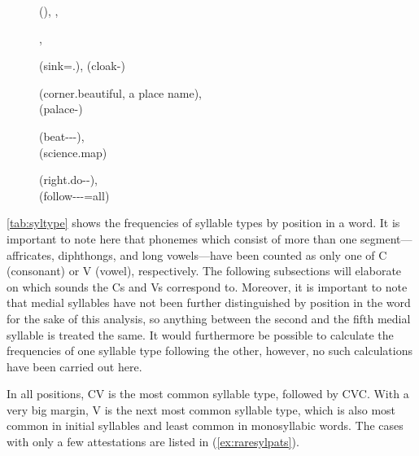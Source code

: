 \begin{figure}
\pex\label{ex:syllperwordtypes}
	\a {} (\AgtT{}),
		,
		
	\a {},
		
	\a {} 
		(sink=\TsgM{}.\Aarg{}), 
		 (cloak-\PargI{})
		
	\a {} (corner.beautiful, a place 
		name),\\
		 (palace-\Gen{})
		
	\a {} 
		(beat-\Ptcp{}-\Nmlz{}-\Parg{}),\\
		(science.map)
		
	\a {} 
		(right.do-\Nmlz{}-\Gen{}),\\
		 (follow-\Agtz-\Pl{}-\Aarg{}=all)
\xe
\end{figure}

\autoref{tab:syltype} shows the frequencies of syllable
types by position in a word. It is important to note here
that phonemes which consist of more than one segment---affricates, diphthongs,
and long vowels---have been counted as only one of C (consonant) or V (vowel),
respectively. The following subsections will elaborate on which sounds the Cs
and Vs correspond to. Moreover, it is important to note that medial syllables
have not been further distinguished by position in the word for the sake of
this analysis, so anything between the second and the fifth medial syllable is
treated the same. It would furthermore be possible to calculate the frequencies
of one syllable type following the other, however, no such calculations have
been carried out here.

In all positions, CV is the most common syllable type, followed by CVC. With a
very big margin, V is the next most common syllable type, which is also most
common in initial syllables and least common in monosyllabic words. The cases
with only a few attestations are listed in (\ref{ex:raresylpats}).

